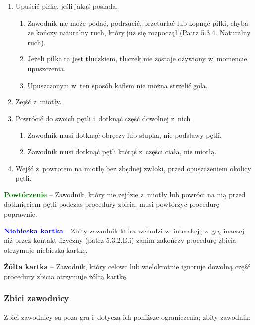 \documentclass[12pt,a4paper]{article}
\newcommand\yellowcard[1]{\bgroup\textcolor{darkyellow}{\textbf{#1}}}
\newcommand\bluecard[1]{\bgroup\textcolor{blue}{\textbf{#1}}}
\newcommand\other[1]{\bgroup\textcolor{darkgreen}{\textbf{#1}}}
\begin{document}
\begin{enumerate}
	\item
	      Upuścić piłkę, jeśli jakąś posiada.

	      \begin{enumerate}
		      \item
		            Zawodnik nie może podać, podrzucić, przeturlać lub kopnąć piłki,
		            chyba że kończy naturalny ruch, który już się rozpoczął (Patrz
		            5.3.4. Naturalny ruch).
		      \item
		            Jeżeli piłka ta jest tłuczkiem, tłuczek nie zostaje ożywiony w~momencie upuszczenia.
		      \item
		            Upuszczonym w~ten sposób kaflem nie można strzelić gola.
	      \end{enumerate}
	\item
	      Zejść z~miotły.
	\item
	      Powrócić do swoich pętli i~dotknąć część dowolnej z~nich.

	      \begin{enumerate}
		      \item
		            Zawodnik musi dotknąć obręczy lub słupka, nie podstawy pętli.
		      \item
		            Zawodnik musi dotknąć pętli którąś z~części ciała, nie miotłą.
	      \end{enumerate}
	\item Wejść z~powrotem na miotłę bez zbędnej zwłoki, przed opuszczeniem
	      okolicy pętli.

\end{enumerate}

\other{Powtórzenie} -- Zawodnik, który nie zejdzie z~miotły lub powróci
na nią przed dotknięciem pętli podczas procedury zbicia, musi powtórzyć
procedurę poprawnie.

\bluecard{Niebieska kartka} -- Zbity zawodnik która wchodzi w~interakcję z~grą inaczej
niż przez kontakt fizyczny (patrz 5.3.2.D.i) zanim zakończy procedurę
zbicia otrzymuje niebieską kartkę.

\yellowcard{Żółta kartka} -- Zawodnik, który celowo lub wielokrotnie ignoruje
dowolną część procedury zbicia otrzymuje żółtą kartkę.

\subsubsection{Zbici zawodnicy}

Zbici zawodnicy są poza grą i~dotyczą ich poniższe ograniczenia; zbity
zawodnik:
\end{document}
